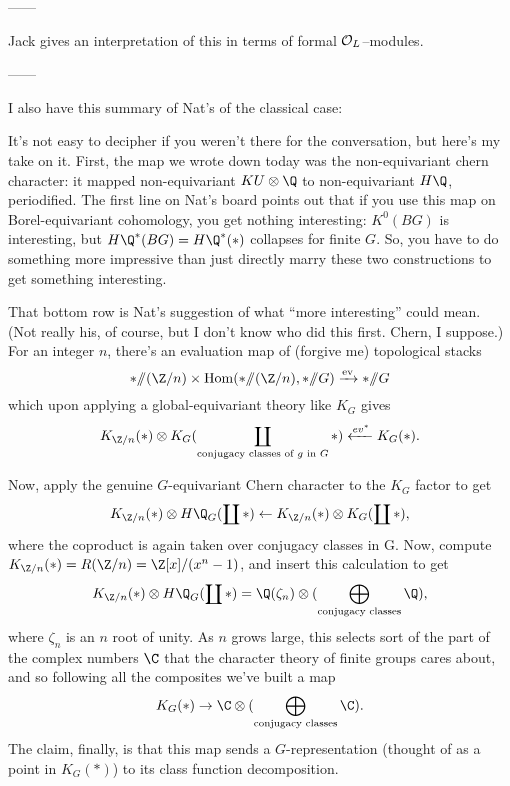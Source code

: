 ------

Jack gives an interpretation of this in terms of formal $\mathcal{O}_L$--modules.

------

I also have this summary of Nat's of the classical case:

It's not easy to decipher if you weren't there for the conversation, but here's my take on it. First, the map we wrote down today was the non-equivariant chern character: it mapped non-equivariant $KU \otimes \Q$ to non-equivariant $H\Q$, periodified. The first line on Nat's board points out that if you use this map on Borel-equivariant cohomology, you get nothing interesting: $K^0(BG)$ is interesting, but $H\Q^*(BG) = H\Q^*(*)$ collapses for finite $G$. So, you have to do something more impressive than just directly marry these two constructions to get something interesting.

That bottom row is Nat's suggestion of what ``more interesting'' could mean. (Not really his, of course, but I don't know who did this first. Chern, I suppose.) For an integer $n$, there's an evaluation map of (forgive me) topological stacks \[* \mmod (\Z/n) \times \operatorname{Hom}(* \mmod (\Z/n), * \mmod G) \xrightarrow{\mathrm{ev}} * \mmod G\] which upon applying a global-equivariant theory like $K_G$ gives \[K_{\Z/n}(*) \otimes K_G(\coprod_{\text{conjugacy classes of $g$ in $G$}} *) \xleftarrow{ev^*} K_G(*).\]

Now, apply the genuine $G$-equivariant Chern character to the $K_G$ factor to get \[K_{\Z/n}(*) \otimes H\Q_G(\coprod *) \from K_{\Z/n}(*) \otimes K_G(\coprod *),\] where the coproduct is again taken over conjugacy classes in G. Now, compute $K_{\Z/n}(*) = R(\Z/n) = \Z[x] / (x^n - 1)$, and insert this calculation to get \[K_{\Z/n}(*) \otimes H\Q_G(\coprod *) = \Q(\zeta_n) \otimes (\bigoplus_{\text{conjugacy classes}} \Q),\] where $\zeta_n$ is an $n${\th} root of unity.  As $n$ grows large, this selects sort of the part of the complex numbers $\C$ that the character theory of finite groups cares about, and so following all the composites we've built a map \[K_G(*) \to \C \otimes (\bigoplus_{\text{conjugacy classes}} \C).\]  The claim, finally, is that this map sends a $G$-representation (thought of as a point in $K_G(*)$) to its class function decomposition.















